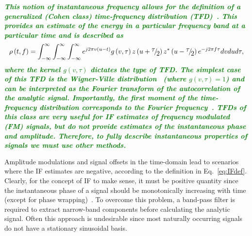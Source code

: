 \documentclass[11pt,draftcls,onecolumn]{IEEEtran}
\newcommand{\dean}[1]{\textsf{\emph{\textbf{\textcolor{green}{#1}}}}}
\begin{document}
\dean{This notion of instantaneous frequency allows for the definition of a generalized (Cohen class) time-frequency distribution (TFD)~\cite{Cohen1995}. This provides an estimate of the energy in a particular frequency band at a particular time and is described as
\begin{equation}\label{CohenClassTFD}
\rho \left( {t,f} \right) = \int_{ - \infty }^\infty  {\int_{ - \infty }^\infty  {\int_{ - \infty }^\infty  {{e^{j2\pi v\left( {u - t} \right)}}g\left( {v,\tau } \right)} } } \,z\left( {u + {\raise0.7ex\hbox{$\tau $} \!\mathord{\left/
{\vphantom {\tau  2}}\right.\kern-\nulldelimiterspace}
\!\lower0.7ex\hbox{$2$}}} \right){z^*}\left( {u - {\raise0.7ex\hbox{$\tau $} \!\mathord{\left/
{\vphantom {\tau  2}}\right.\kern-\nulldelimiterspace}
\!\lower0.7ex\hbox{$2$}}} \right){e^{ - j2\pi f\tau }}dvdud\tau,
\end{equation}
where the kernel $g(v,\tau)$ dictates the type of TFD. The simplest case of this TFD is the Wigner-Ville distribution~\cite{Ville1958} (where $g(v,\tau) = 1$) and can be interpreted as the Fourier transform of the autocorrelation of the analytic signal. Importantly, the first moment of the time-frequency distribution corresponds to the Fourier frequency~\cite{Boashash1992}. TFDs of this class are very useful for IF estimates of frequency modulated (FM) signals, but do not provide estimates of the instantaneous phase and amplitude. Therefore, to fully describe instantaneous properties of signals we must use other methods.
}

Amplitude modulations and signal offsets in the time-domain lead to scenarios where the IF estimates are negative, according to the definition in Eq.~\ref{eq:IFdef}. Clearly, for the concept of IF to make sense, it must be positive quantity since the instantaneous phase of a signal should be monotonically increasing with time (except for phase wrapping)~\cite{Huang1998}. To overcome this problem, a band-pass filter is required to extract narrow-band components before calculating the analytic signal. Often this approach is undesirable since most naturally occurring signals do not have a stationary sinusoidal basis. 
\end{document}
